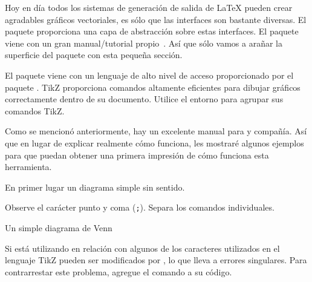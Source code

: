 Hoy en día todos los sistemas de generación de salida de \LaTeX{} pueden crear agradables gráficos vectoriales, es sólo que las interfaces son bastante diversas. El paquete  proporciona una capa de abstracción sobre estas interfaces. El paquete  viene con un gran manual/tutorial propio~\cite{pgfplot}. Así que sólo vamos a arañar la superficie del paquete con esta pequeña sección.

El paquete  viene con un lenguaje de alto nivel de acceso proporcionado por el paquete . TikZ proporciona comandos altamente eficientes para dibujar gráficos correctamente dentro de su documento. Utilice el entorno  para agrupar sus comandos TikZ.

Como se mencionó anteriormente, hay un excelente manual para  y compañía. Así que en lugar de explicar realmente cómo funciona, les mostraré algunos ejemplos para que puedan obtener una primera impresión de cómo funciona esta herramienta.

En primer lugar un diagrama simple sin sentido.
\begin{example}
\end{example}
Observe el carácter punto y coma (\texttt{;}). Separa los comandos individuales.

Un simple diagrama  de Venn
\begin{example}
\shorthandoff{:}
\end{example}
Si está utilizando  en relación con  algunos de los caracteres utilizados en el lenguaje TikZ pueden ser modificados por , lo que lleva a errores singulares. Para contrarrestar este problema, agregue el comando  a su código.

